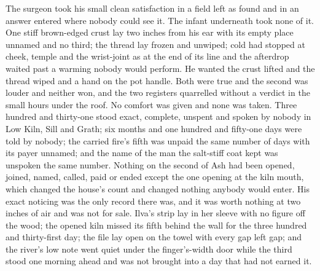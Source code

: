 The surgeon took his small clean satisfaction in a field left as found and in an answer entered where nobody could see it. The infant underneath took none of it. One stiff brown-edged crust lay two inches from his ear with its empty place unnamed and no third; the thread lay frozen and unwiped; cold had stopped at cheek, temple and the wrist-joint as at the end of its line and the afterdrop waited past a warming nobody would perform. He wanted the crust lifted and the thread wiped and a hand on the pot handle. Both were true and the second was louder and neither won, and the two registers quarrelled without a verdict in the small hours under the roof. No comfort was given and none was taken. Three hundred and thirty-one stood exact, complete, unspent and spoken by nobody in Low Kiln, Sill and Grath; six months and one hundred and fifty-one days were told by nobody; the carried fire's fifth was unpaid the same number of days with its payer unnamed; and the name of the man the salt-stiff coat kept was unspoken the same number. Nothing on the second of Ash had been opened, joined, named, called, paid or ended except the one opening at the kiln mouth, which changed the house's count and changed nothing anybody would enter. His exact noticing was the only record there was, and it was worth nothing at two inches of air and was not for sale. Ilva's strip lay in her sleeve with no figure off the wood; the opened kiln missed its fifth behind the wall for the three hundred and thirty-first day; the file lay open on the towel with every gap left gap; and the river's low note went quiet under the finger's-width door while the third stood one morning ahead and was not brought into a day that had not earned it.
